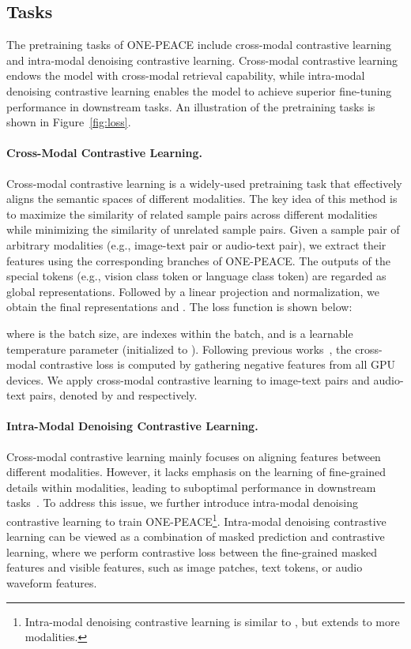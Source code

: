 \documentclass{article}
\newcommand{\onepeace}{ONE-PEACE\xspace}
\begin{document}
\subsection{Tasks}
The pretraining tasks of \onepeace include cross-modal contrastive learning and intra-modal denoising contrastive learning. 
Cross-modal contrastive learning endows the model with cross-modal retrieval capability, while intra-modal denoising contrastive learning enables the model to achieve superior fine-tuning performance in downstream tasks. 
An illustration of the pretraining tasks is shown in Figure~\ref{fig:loss}.

\paragraph{Cross-Modal Contrastive Learning.}








Cross-modal contrastive learning is a widely-used pretraining task that effectively aligns the semantic spaces of different modalities. 
The key idea of this method is to maximize the similarity of related sample pairs across different modalities while minimizing the similarity of unrelated sample pairs.
Given a sample pair  of arbitrary modalities (e.g., image-text pair or audio-text pair), we extract their features using the corresponding branches of \onepeace.
The outputs of the special tokens (e.g., vision class token or language class token) are regarded as global representations. Followed by a linear projection and normalization, we obtain the final representations  and . The loss function is shown below:



where  is the batch size,  are indexes within the batch, and  is a learnable temperature parameter (initialized to ). Following previous works~\cite{clip,align}, the cross-modal contrastive loss is computed by gathering negative features from all GPU devices.
We apply cross-modal contrastive learning to image-text pairs and audio-text pairs, denoted by  and  respectively.


\paragraph{Intra-Modal Denoising Contrastive Learning.}




Cross-modal contrastive learning mainly focuses on aligning features between different modalities. 
However, it lacks emphasis on the learning of fine-grained details within modalities, leading to suboptimal performance in downstream tasks~\cite{fd-clip}. 
To address this issue, we further introduce intra-modal denoising contrastive learning to train \onepeace\footnote{Intra-modal denoising contrastive learning is similar to \cite{conmim}, but extends to more modalities.}.
Intra-modal denoising contrastive learning can be viewed as a combination of masked prediction and contrastive learning, where we perform contrastive loss between the fine-grained masked features and visible features, such as image patches, text tokens, or audio waveform features.
\end{document}
